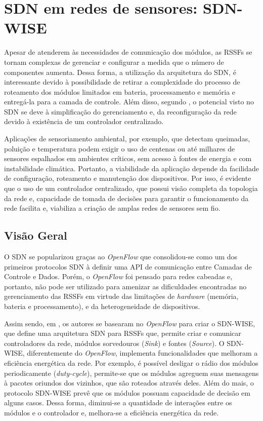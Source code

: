 \section{\ac{SDN} em redes de sensores: SDN-WISE}
\label{s_c2_wise_sdn}

Apesar de atenderem às necessidades de comunicação dos módulos, as \ac{RSSF}s se tornam complexas de gerenciar e configurar a medida que o número de componentes aumenta. Dessa forma, a utilização da arquitetura do \ac{SDN}, é interessante devido à possibilidade de retirar a complexidade do processo de roteamento dos módulos limitados em bateria, processamento e memória e entregá-la para a camada de controle. Além disso, segundo , o potencial visto no \ac{SDN} se deve à simplificação do gerenciamento e, da reconfiguração da rede devido à existência de um controlador centralizado.  

Aplicações de sensoriamento ambiental, por exemplo, que detectam queimadas, poluição e temperatura podem exigir o uso de centenas ou até milhares de sensores espalhados em ambientes críticos, sem acesso à fontes de energia e com instabilidade climática. Portanto, a viabilidade da aplicação depende da facilidade de configuração, roteamento e manutenção dos dispositivos. Por isso, é evidente que o uso de um controlador centralizado, que possui visão completa da topologia da rede e, capacidade de tomada de decisões para garantir o funcionamento da rede facilita e, viabiliza a criação de amplas redes de sensores sem fio.

\subsection{Visão Geral}

O \ac{SDN} se popularizou graças ao \textit{OpenFlow} que consolidou-se como um dos primeiros protocolos \ac{SDN} à definir uma \ac{API} de comunicação entre Camadas de Controle e Dados. Porém, o \textit{OpenFlow} foi pensado para redes cabeadas e, portanto, não pode ser utilizado para amenizar as dificuldades encontradas no gerenciamento das \ac{RSSF}s em virtude das limitações de \textit{hardware} (memória, bateria e processamento), e da heterogeneidade de dispositivos. 

Assim sendo, em , os autores se basearam no \textit{OpenFlow} para criar o \ac{SDN-WISE}, que define uma arquitetura \ac{SDN} para \ac{RSSF}s que, permite criar e comunicar controladores da rede, módulos sorvedouros (\textit{Sink}) e fontes (\textit{Source}). O \ac{SDN-WISE}, diferentemente do \textit{OpenFlow}, implementa funcionalidades que melhoram a eficiência energética da rede. Por exemplo, é possível desligar o rádio dos módulos periodicamente (\textit{duty-cycle}), permite-se que os módulos agreguem suas mensagens à pacotes oriundos dos vizinhos, que são roteados através deles. Além do mais, o protocolo \ac{SDN-WISE} prevê que os módulos possuam capacidade de decisão em alguns casos. Dessa forma, diminui-se a quantidade de interações entre os módulos e o controlador e, melhora-se a eficiência energética da rede.

